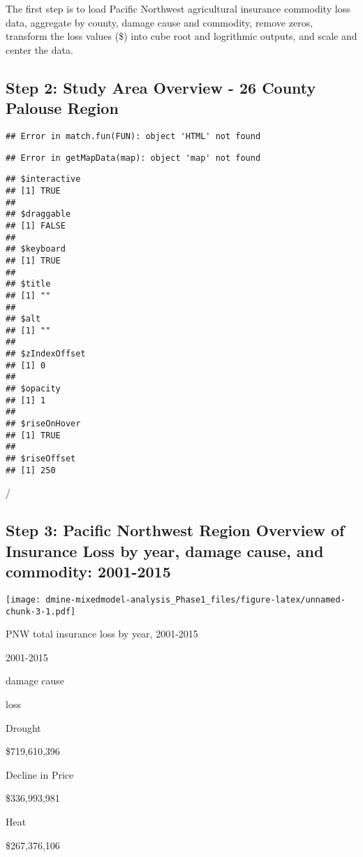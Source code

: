 \documentclass[]{article}
\begin{document}
The first step is to load Pacific Northwest agricultural insurance
commodity loss data, aggregate by county, damage cause and commodity,
remove zeros, transform the loss values (\$) into cube root and
logrithmic outputs, and scale and center the data.

\subsection{Step 2: Study Area Overview - 26 County Palouse
Region}\label{step-2-study-area-overview---26-county-palouse-region}

\begin{verbatim}
## Error in match.fun(FUN): object 'HTML' not found
\end{verbatim}

\begin{verbatim}
## Error in getMapData(map): object 'map' not found
\end{verbatim}

\begin{verbatim}
## $interactive
## [1] TRUE
## 
## $draggable
## [1] FALSE
## 
## $keyboard
## [1] TRUE
## 
## $title
## [1] ""
## 
## $alt
## [1] ""
## 
## $zIndexOffset
## [1] 0
## 
## $opacity
## [1] 1
## 
## $riseOnHover
## [1] TRUE
## 
## $riseOffset
## [1] 250
\end{verbatim}

/

\subsection{Step 3: Pacific Northwest Region Overview of Insurance Loss
by year, damage cause, and commodity:
2001-2015}\label{step-3-pacific-northwest-region-overview-of-insurance-loss-by-year-damage-cause-and-commodity-2001-2015}

\texttt{[image: dmine-mixedmodel-analysis\_Phase1\_files/figure-latex/unnamed-chunk-3-1.pdf]}

PNW total insurance loss by year, 2001-2015

2001-2015

damage cause

loss

Drought

\$719,610,396

Decline in Price

\$336,993,981

Heat

\$267,376,106
\end{document}
